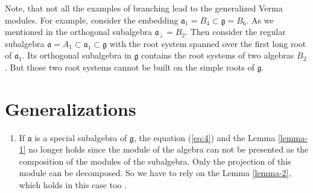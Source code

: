 \documentclass[12pt]{article}
\theoremstyle{definition}
\newcommand{\gf}{\mathfrak{g}}
\newcommand{\af}{\mathfrak{a}}
\newcommand{\afb}{\mathfrak{a}_{\bot}}
\begin{document}
Note, that not all the examples of branching lead to the generalized Verma modules. For example,
consider the embedding $\af_{1}=B_{4}\subset \gf=B_{6}$. As we mentioned in \cite{2010arXiv1007.0318L} the
orthogonal subalgebra $\afb=B_{2}$. Then consider the regular subalgebra $\af=A_{1}\subset
\af_{1}\subset \gf$ with the root system spanned over the first long root of $\af_{1}$. Its
orthogonal subalgebra in $\gf$ contains the root systems of two algebras $B_{2}$. But those two root
systems cannot be built on the simple roots of $\gf$.
\section{Generalizations}
\label{sec:generalizations}

\begin{enumerate}
\item If $\af$ is a special subalgebra of $\gf$, the equation (\ref{eq:4}) and the Lemma \ref{lemma-1} no longer holds since the module of the algebra can not be presented as the composition of the modules of the subalgebra. Only the projection of this module can be decomposed. So we have to rely on the Lemma \ref{lemma-2}, which holds in this case too \cite{2010arXiv1007.0318L}.


\end{enumerate}
\end{document}
